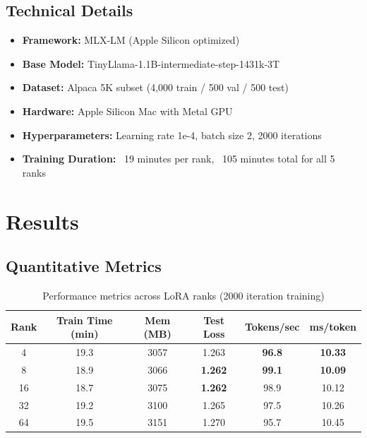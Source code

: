 \documentclass[11pt,a4paper]{article}
\begin{document}
\subsection*{Technical Details}
\begin{itemize}
    \item \textbf{Framework:} MLX-LM (Apple Silicon optimized)
    \item \textbf{Base Model:} TinyLlama-1.1B-intermediate-step-1431k-3T
    \item \textbf{Dataset:} Alpaca 5K subset (4,000 train / 500 val / 500 test)
    \item \textbf{Hardware:} Apple Silicon Mac with Metal GPU
    \item \textbf{Hyperparameters:} Learning rate 1e-4, batch size 2, 2000 iterations
    \item \textbf{Training Duration:} ~19 minutes per rank, ~105 minutes total for all 5 ranks
\end{itemize}

\section*{Results}

\subsection*{Quantitative Metrics}
\begin{table}[H]
\centering
\small
\begin{tabular}{@{}cccccc@{}}
\toprule
\textbf{Rank} & \textbf{Train Time (min)} & \textbf{Mem (MB)} & \textbf{Test Loss} & \textbf{Tokens/sec} & \textbf{ms/token} \\
\midrule
4  & 19.3 & 3057 & 1.263 & \textbf{96.8} & \textbf{10.33} \\
8  & 18.9 & 3066 & \textbf{1.262} & \textbf{99.1} & \textbf{10.09} \\
16 & 18.7 & 3075 & \textbf{1.262} & 98.9 & 10.12 \\
32 & 19.2 & 3100 & 1.265 & 97.5 & 10.26 \\
64 & 19.5 & 3151 & 1.270 & 95.7 & 10.45 \\
\bottomrule
\end{tabular}
\caption{Performance metrics across LoRA ranks (2000 iteration training)}
\end{table}
\end{document}

